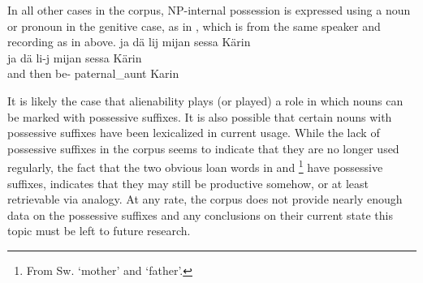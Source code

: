 In all other cases in the corpus, NP-internal possession is expressed using a noun or pronoun in the genitive case, as in , which is from the same speaker and recording as in  above.
\ea\label{noPossSuffix1}
\glll	ja dä lij mijan sessa Kärin\\
	ja dä li-j mijan sessa Kärin\\
	and then be-  paternal\_aunt\BS{} Karin \\\nopagebreak
{}	
\z

It is likely the case that alienability plays (or played) a role in which nouns can be marked with possessive suffixes. It is also possible that certain nouns with possessive suffixes have been lexicalized in current usage. %
While the lack of possessive suffixes in the corpus seems to indicate that they are no longer used regularly, the fact that the two obvious loan words in  and \footnote{From Sw.  ‘mother’ and  ‘father’.} 
have possessive suffixes, indicates that they may still be productive somehow, or at least retrievable via analogy. At any rate, the corpus does not provide nearly enough data on the possessive suffixes and any conclusions on their current state this topic must be left to future research.



%